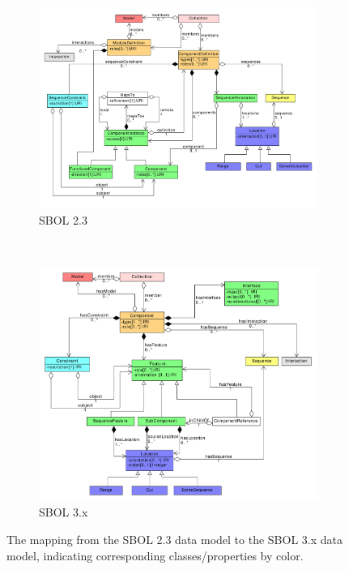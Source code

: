 \begin{figure}[htp]
	\begin{subfigure}{\textwidth}
		\centering
		\includegraphics[width=0.75\linewidth]{uml/sbol_v2_to_v3_left_subfigure}  
		\caption{SBOL 2.3}
		\label{fig:sub-first}
              \end{subfigure}\\
              \begin{subfigure}{\textwidth}
		\centering
		\includegraphics[width=0.75\linewidth]{uml/sbol_v2_to_v3_right_subfigure}  
		\caption{SBOL 3.x}
		\label{fig:sub-second}
	\end{subfigure}
	\caption{\label{SBOL2TO3}The mapping from the SBOL 2.3 data model to the SBOL 3.x  data model, indicating corresponding classes/properties by color.}
\end{figure}
